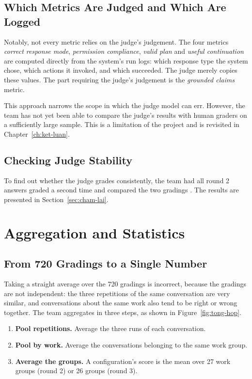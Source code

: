 \subsection{Which Metrics Are Judged and Which Are Logged}

Notably, not every metric relies on the judge's judgement. The four metrics \emph{correct response mode}, \emph{permission compliance}, \emph{valid plan} and \emph{useful continuation} are computed directly from the system's run logs: which response type the system chose, which actions it invoked, and which succeeded. The judge merely copies these values. The part requiring the judge's judgement is the \emph{grounded claims} metric.

This approach narrows the scope in which the judge model can err. However, the team has not yet been able to compare the judge's results with human graders on a sufficiently large sample. This is a limitation of the project and is revisited in Chapter~\ref{ch:ket-luan}.

\subsection{Checking Judge Stability}

To find out whether the judge grades consistently, the team had all round 2 answers graded a second time and compared the two gradings . The results are presented in Section~\ref{sec:cham-lai}.

\section{Aggregation and Statistics}

\subsection{From 720 Gradings to a Single Number}

Taking a straight average over the 720 gradings is incorrect, because the gradings are not independent: the three repetitions of the same conversation are very similar, and conversations about the same work also tend to be right or wrong together. The team aggregates in three steps, as shown in Figure~\ref{fig:tong-hop}.


\begin{enumerate}
    \item \textbf{Pool repetitions.} Average the three runs of each conversation.
    \item \textbf{Pool by work.} Average the conversations belonging to the same work group.
    \item \textbf{Average the groups.} A configuration's score is the mean over 27 work groups (round 2) or 26 groups (round 3).
\end{enumerate}

